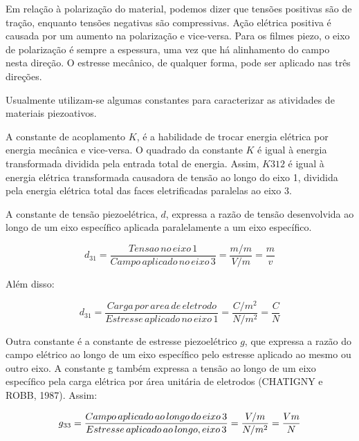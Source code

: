 \documentclass[
	12pt,				
	oneside,			
	a4paper,			
	english,			
	brazil,			
	]{abntex2ppgsi}
\begin{document}
Em relação à polarização do material, podemos dizer que tensões positivas são de tração, enquanto tensões negativas são compressivas. Ação elétrica positiva é causada por um aumento na polarização e vice-versa. Para os filmes piezo, o eixo de polarização é sempre a espessura, uma vez que há alinhamento do campo nesta direção. O estresse mecânico, de qualquer forma, pode ser aplicado nas três direções. 

Usualmente utilizam-se algumas constantes para caracterizar as atividades de materiais piezoativos. 

A constante de acoplamento $K$, é a habilidade de trocar energia elétrica por energia mecânica e vice-versa. O quadrado da constante $K$ é igual à energia transformada dividida pela entrada total de energia. Assim, $K312$ é igual à energia elétrica transformada causadora de tensão ao longo do eixo 1, dividida pela energia elétrica total das faces eletrificadas paralelas ao eixo 3. 

A constante de tensão piezoelétrica, $d$, expressa a razão de tensão desenvolvida ao longo de um eixo específico aplicada paralelamente a um eixo específico. 

\begin{equation}
	d_{31} = \frac{Tensao \,no \,eixo \,1}{Campo \,aplicado \,no \,eixo \,3} = \frac{m/m}{V/m} = \frac{m}{v}
	\label{eq: Constante de Tensão Piezoelétrica}
\end{equation}



Além disso:

\begin{equation}
	d_{31} = \frac{Carga \,por \,area \,de \,eletrodo}{Estresse \,aplicado \,no \,eixo \,1} = \frac{C/m^{2}}{N/m^{2}} = \frac{C}{N}
	\label{eq: Boa pergunta}
\end{equation}

Outra constante é a constante de estresse piezoelétrico $g$, que expressa a razão do campo elétrico ao longo de um eixo específico pelo estresse aplicado ao mesmo ou outro eixo. A constante g também expressa a tensão ao longo de um eixo específico pela carga elétrica por área unitária de eletrodos (CHATIGNY e ROBB, 1987). Assim:

\begin{equation}
	g_{33} = \frac{Campo \,aplicado \,ao \,longo \,do \,eixo \,3}{Estresse \,aplicado \,ao \,longo ,\do \,eixo \,3} = \frac{V/m}{N/m^{2}} = \frac{Vm}{N}
	\label{eq: Constante G, expressando a razão do campo elétrico ao longo do eixo.}
\end{equation}
\end{document}

